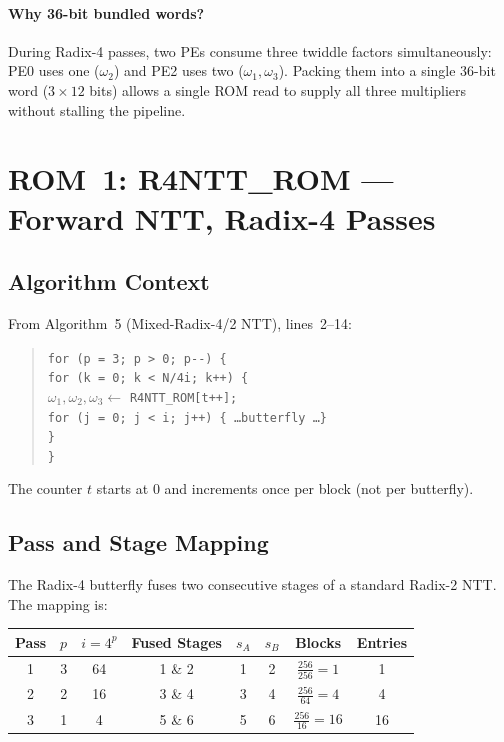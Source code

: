 \documentclass[11pt,a4paper]{article}
\newcommand{\rom}[1]{\textsc{#1}}
\begin{document}
\paragraph{Why 36-bit bundled words?}
During Radix-4 passes, two PEs consume three twiddle factors simultaneously: PE0 uses one ($\omega_2$) and PE2 uses two ($\omega_1, \omega_3$). Packing them into a single 36-bit word ($3 \times 12$ bits) allows a single ROM read to supply all three multipliers without stalling the pipeline.

\section{ROM~1: \rom{R4NTT\_ROM} --- Forward NTT, Radix-4 Passes}
\label{sec:r4ntt-rom}

\subsection{Algorithm Context}

From Algorithm~5 (Mixed-Radix-4/2 NTT), lines~2--14:

\begin{quote}
\texttt{for (p = 3; p > 0; p-{}-) \{}\\
\quad \texttt{for (k = 0; k < N/4i; k++) \{}\\
\quad\quad $\omega_1, \omega_2, \omega_3 \leftarrow$ \texttt{R4NTT\_ROM[t++];}\\
\quad\quad \texttt{for (j = 0; j < i; j++) \{ \ldots butterfly \ldots \}}\\
\quad \texttt{\}}\\
\texttt{\}}
\end{quote}

The counter $t$ starts at 0 and increments once per block (not per butterfly).

\subsection{Pass and Stage Mapping}

The Radix-4 butterfly fuses two consecutive stages of a standard Radix-2 NTT. The mapping is:

\begin{center}
\renewcommand{\arraystretch}{1.3}
\begin{tabular}{cccccccc}
  \toprule
  \textbf{Pass} & $p$ & $i = 4^p$ & \textbf{Fused Stages} & $s_A$ & $s_B$ & \textbf{Blocks} & \textbf{Entries} \\
  \midrule
  1 & 3 & 64  & 1 \& 2 & 1 & 2 & $\frac{256}{256} = 1$  & 1  \\
  2 & 2 & 16  & 3 \& 4 & 3 & 4 & $\frac{256}{64} = 4$   & 4  \\
  3 & 1 & 4   & 5 \& 6 & 5 & 6 & $\frac{256}{16} = 16$  & 16 \\
  \bottomrule
\end{tabular}
\end{center}
\end{document}
